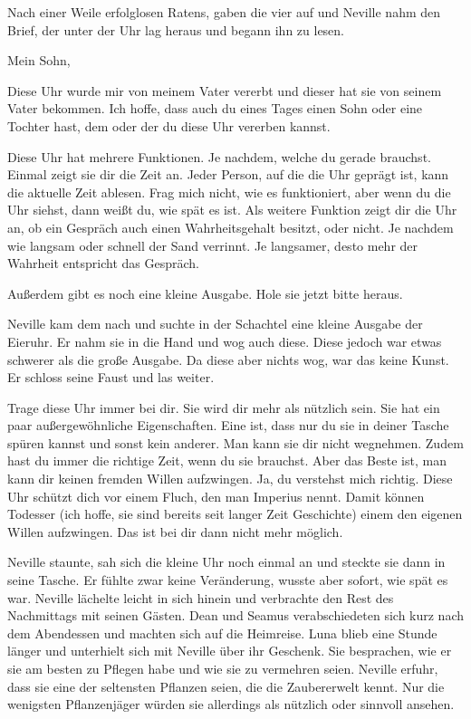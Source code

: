 Nach einer Weile erfolglosen Ratens, gaben die vier auf und Neville nahm den Brief, der unter der Uhr lag heraus und begann ihn zu lesen.

\begin{brief}
Mein Sohn,

Diese Uhr wurde mir von meinem Vater vererbt und dieser hat sie von seinem Vater bekommen. Ich hoffe, dass auch du eines Tages einen Sohn oder eine Tochter hast, dem oder der du diese Uhr vererben kannst.

Diese Uhr hat mehrere Funktionen. Je nachdem, welche du gerade brauchst. Einmal zeigt sie dir die Zeit an. Jeder Person, auf die die Uhr geprägt ist, kann die aktuelle Zeit ablesen. Frag mich nicht, wie es funktioniert, aber wenn du die Uhr siehst, dann weißt du, wie spät es ist. Als weitere Funktion zeigt dir die Uhr an, ob ein Gespräch auch einen Wahrheitsgehalt besitzt, oder nicht. Je nachdem wie langsam oder schnell der Sand verrinnt. Je langsamer, desto mehr der Wahrheit entspricht das Gespräch.

Außerdem gibt es noch eine kleine Ausgabe. Hole sie jetzt bitte heraus.
\end{brief}

Neville kam dem nach und suchte in der Schachtel eine kleine Ausgabe der Eieruhr. Er nahm sie in die Hand und wog auch diese. Diese jedoch war etwas schwerer als die große Ausgabe. Da diese aber nichts wog, war das keine Kunst. Er schloss seine Faust und las weiter.

\begin{brief}
Trage diese Uhr immer bei dir. Sie wird dir mehr als nützlich sein. Sie hat ein paar außergewöhnliche Eigenschaften. Eine ist, dass nur du sie in deiner Tasche spüren kannst und sonst kein anderer. Man kann sie dir nicht wegnehmen. Zudem hast du immer die richtige Zeit, wenn du sie brauchst. Aber das Beste ist, man kann dir keinen fremden Willen aufzwingen. Ja, du verstehst mich richtig. Diese Uhr schützt dich vor einem Fluch, den man Imperius nennt. Damit können Todesser (ich hoffe, sie sind bereits seit langer Zeit Geschichte) einem den eigenen Willen aufzwingen. Das ist bei dir dann nicht mehr möglich.
\end{brief}

Neville staunte, sah sich die kleine Uhr noch einmal an und steckte sie dann in seine Tasche. Er fühlte zwar keine Veränderung, wusste aber sofort, wie spät es war. Neville lächelte leicht in sich hinein und verbrachte den Rest des Nachmittags mit seinen Gästen. Dean und Seamus verabschiedeten sich kurz nach dem Abendessen und machten sich auf die Heimreise. Luna blieb eine Stunde länger und unterhielt sich mit Neville über ihr Geschenk. Sie besprachen, wie er sie am besten zu Pflegen habe und wie sie zu vermehren seien. Neville erfuhr, dass sie eine der seltensten Pflanzen seien, die die Zaubererwelt kennt. Nur die wenigsten Pflanzenjäger würden sie allerdings als nützlich oder sinnvoll ansehen.


